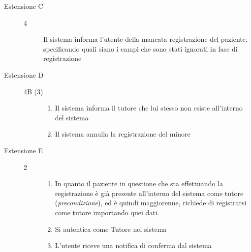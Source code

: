 \begin{description}
\begin{description}
	\item[Estensione C]
	\medskip
	
	\begin{description}
	\item[4] 
	\medskip
	
	Il sistema informa l'utente della mancata registrazione del paziente, specificando quali siano i campi che sono stati ignorati in fase di registrazione
	\end{description}
\end{description}

\begin{description}
	\item[Estensione D]
	\medskip
	
	\begin{description}
	\item[4B (3)] 
	\medskip
	
	\begin{enumerate}
	\item Il sistema informa il tutore che lui stesso non esiste all'interno del sistema
	\item Il sistema annulla la registrazione del minore 
	\end{enumerate}
	\end{description}

\end{description}


\begin{description}
	\item[Estensione E]
	\medskip
	
	\begin{description}
	\item[2] 
	\medskip
	
	\begin{enumerate}
	\item In quanto il paziente in questione che sta effettuando la registrazione
		è già presente all'interno del sistema come tutore (\textit{precondizione}),
		ed è quindi maggiorenne, richiede di registrarsi come tutore
		importando quei dati.
	\item Si autentica come Tutore nel sistema
	\item L'utente riceve una notifica di conferma dal sistema
	\end{enumerate}
	\end{description}

\end{description}


\end{description}
